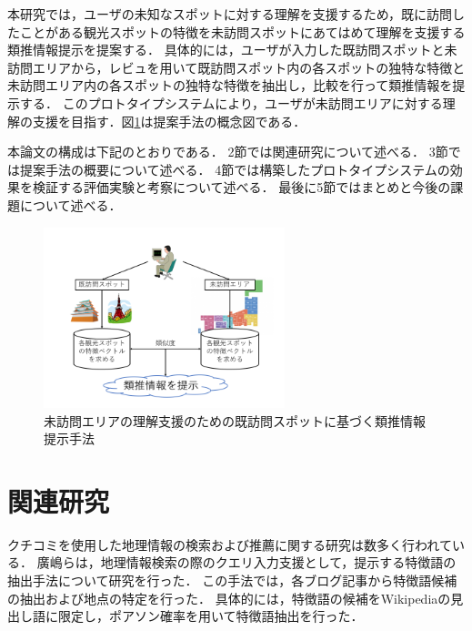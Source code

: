 \documentclass{deimj}
\begin{document}
本研究では，ユーザの未知なスポットに対する理解を支援するため，既に訪問したことがある観光スポットの特徴を未訪問スポットにあてはめて理解を支援する類推情報提示を提案する．
具体的には，ユーザが入力した既訪問スポットと未訪問エリアから，レビュを用いて既訪問スポット内の各スポットの独特な特徴と未訪問エリア内の各スポットの独特な特徴を抽出し，比較を行って類推情報を提示する．
このプロトタイプシステムにより，ユーザが未訪問エリアに対する理解の支援を目指す．図\ref{fig:photo_image}は提案手法の概念図である．

本論文の構成は下記のとおりである．
2節では関連研究について述べる．
3節では提案手法の概要について述べる．
4節では構築したプロトタイプシステムの効果を検証する評価実験と考察について述べる．
最後に5節ではまとめと今後の課題について述べる．

\begin{figure}[t]
  \begin{center}
    \includegraphics[clip,width=7.0cm]{picture/Photo_Image.png}
    \caption{未訪問エリアの理解支援のための既訪問スポットに基づく類推情報提示手法}
    \label{fig:photo_image}
   \end{center}
\end{figure}


\section{関連研究}
\label{sec:Related Work}
クチコミを使用した地理情報の検索および推薦に関する研究は数多く行われている．
廣嶋ら\cite{Codd01}は，地理情報検索の際のクエリ入力支援として，提示する特徴語の抽出手法について研究を行った．
この手法では，各ブログ記事から特徴語候補の抽出および地点の特定を行った．
具体的には，特徴語の候補をWikipediaの見出し語に限定し，ポアソン確率を用いて特徴語抽出を行った．
\end{document}
